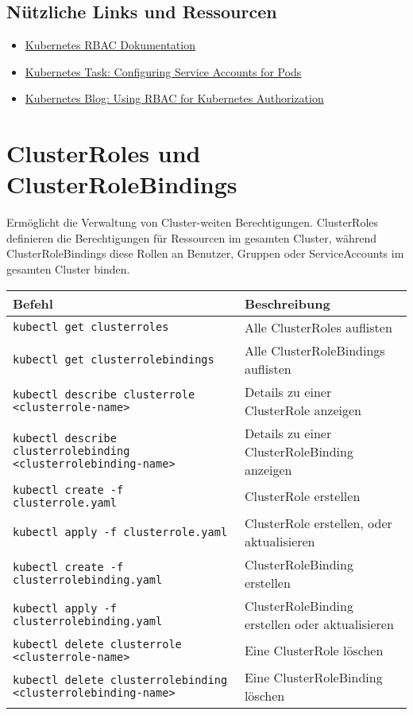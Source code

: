 \subsection*{Nützliche Links und Ressourcen}
\begin{itemize}
    \item \href{https://kubernetes.io/docs/reference/access-authn-authz/rbac/}{Kubernetes RBAC Dokumentation}
    \item \href{https://kubernetes.io/docs/tasks/configure-pod-container/configure-service-account/}{Kubernetes Task: Configuring Service Accounts for Pods}
    \item \href{https://kubernetes.io/blog/2017/10/using-rbac-generally-available-18/}{Kubernetes Blog: Using RBAC for Kubernetes Authorization}
\end{itemize}

\newpage

\section{ClusterRoles und ClusterRoleBindings}
Ermöglicht die Verwaltung von Cluster-weiten Berechtigungen. ClusterRoles definieren die Berechtigungen für Ressourcen im gesamten Cluster, während ClusterRoleBindings diese Rollen an Benutzer, Gruppen oder ServiceAccounts im gesamten Cluster binden.\\

\noindent
\begin{tabular}{|p{}|p{}|}
\hline
\textbf{Befehl} & \textbf{Beschreibung} \\
\hline
\texttt{kubectl get clusterroles} & Alle ClusterRoles auflisten \\
\texttt{kubectl get clusterrolebindings} & Alle ClusterRoleBindings auflisten \\
\texttt{kubectl describe clusterrole <clusterrole-name>} & Details zu einer ClusterRole anzeigen \\
\texttt{kubectl describe clusterrolebinding <clusterrolebinding-name>} & Details zu einer ClusterRoleBinding anzeigen \\
\texttt{kubectl create -f clusterrole.yaml} & ClusterRole erstellen\\
\texttt{kubectl apply -f clusterrole.yaml} & ClusterRole erstellen, oder aktualisieren\\
\texttt{kubectl create -f clusterrolebinding.yaml} & ClusterRoleBinding erstellen\\
\texttt{kubectl apply -f clusterrolebinding.yaml} & ClusterRoleBinding erstellen oder aktualisieren\\
\texttt{kubectl delete clusterrole <clusterrole-name>} & Eine ClusterRole löschen \\
\texttt{kubectl delete clusterrolebinding <clusterrolebinding-name>} & Eine ClusterRoleBinding löschen \\
\hline
\end{tabular}

